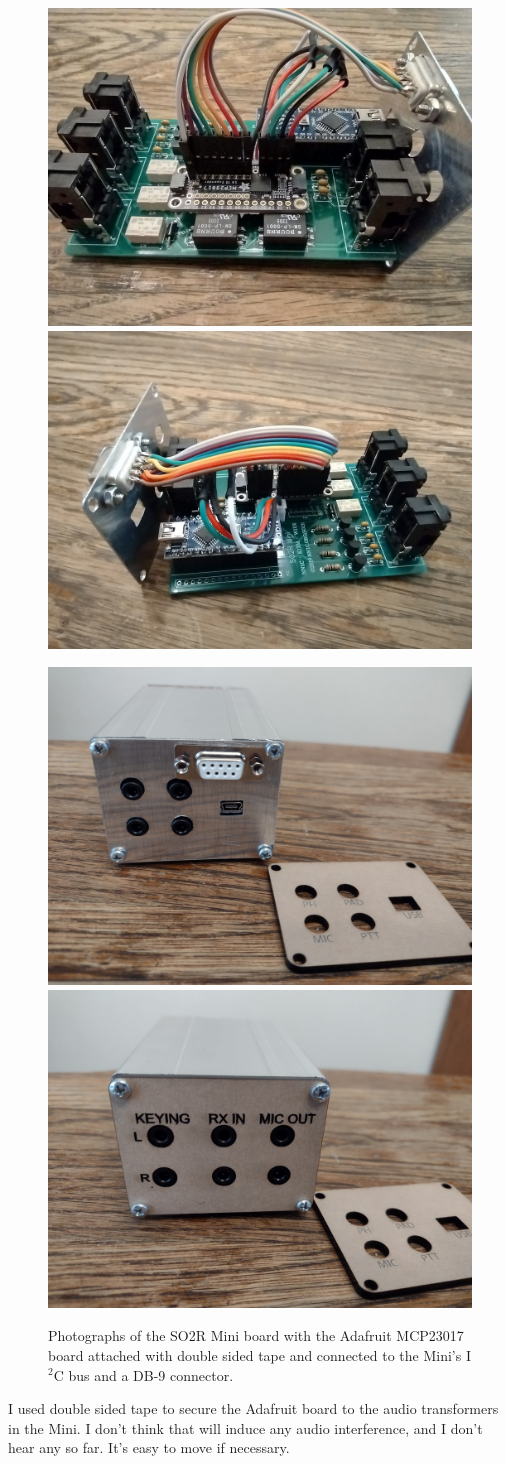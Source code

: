 \documentclass[12pt]{article}
\begin{document}
\begin{figure}[htb]
\includegraphics[width=.5\textwidth]{Adafruit_MCP23017_mounted_1.jpg}
\includegraphics[width=.5\textwidth]{i2c_plug_and_db9_1.jpg}

\includegraphics[width=.5\textwidth]{db9_position_1.jpg}
\includegraphics[width=.5\textwidth]{opposite_end_1.jpg}

\caption{Photographs of the SO2R Mini board with the Adafruit MCP23017
board attached with double sided tape and connected to the Mini's
I$^2$C bus and a DB-9 connector.
}
\label{f1.mcp23017_mount}
\end{figure}
I used double sided tape to secure the Adafruit board to the audio
transformers in the Mini.
I don't think that will 
induce any audio interference, and
I don't hear any so far. It's easy to move if necessary.
\end{document}
